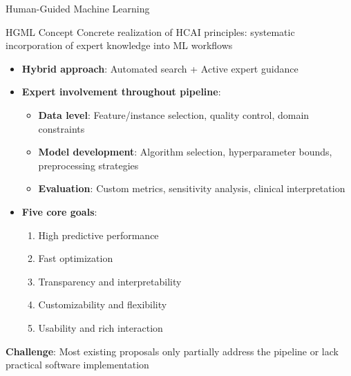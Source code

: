 \documentclass[aspectratio=169,10pt,english,dvipsnames]{beamer}
\begin{document}
\begin{frame}{Human-Guided Machine Learning}
    \begin{block}{HGML Concept}
        Concrete realization of HCAI principles: systematic incorporation of expert knowledge into ML workflows
    \end{block}
    
    \begin{itemize}
        \item \textbf{Hybrid approach}: Automated search + Active expert guidance
        
        \item \textbf{Expert involvement throughout pipeline}:\\
        \begin{itemize}
            \item \textbf{Data level}: Feature/instance selection, quality control, domain constraints\\
            \item \textbf{Model development}: Algorithm selection, hyperparameter bounds, preprocessing strategies\\
            \item \textbf{Evaluation}: Custom metrics, sensitivity analysis, clinical interpretation
        \end{itemize}
        
        \item \textbf{Five core goals}:
        \begin{enumerate}
            \item High predictive performance
            \item Fast optimization
            \item Transparency and interpretability
            \item Customizability and flexibility
            \item Usability and rich interaction
        \end{enumerate}
    \end{itemize}
    
    \textbf{Challenge}: Most existing proposals only partially address the pipeline or lack practical software implementation
\end{frame}
\end{document}
